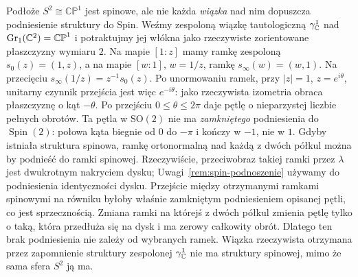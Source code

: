 \begin{przyklad}
\label{prz:nie-spin-linia}
Podłoże $S^2\cong\mathbb{CP}^1$ jest spinowe,
ale nie każda \emph{wiązka} nad nim dopuszcza
podniesienie struktury do Spin.
Weźmy zespoloną wiązkę tautologiczną
$\gamma^1_{\mathbb{C}}$ nad
$\operatorname{Gr}_1(\mathbb{C}^2)=\mathbb{CP}^1$
i potraktujmy jej włókna jako rzeczywiste
zorientowane płaszczyzny wymiaru $2$.
Na mapie $[1:z]$ mamy ramkę zespoloną
$s_0(z)=(1,z)$, a na mapie $[w:1]$,
$w=1/z$, ramkę $s_\infty(w)=(w,1)$.
Na przecięciu
$s_\infty(1/z)=z^{-1}s_0(z)$.
Po unormowaniu ramek, przy $|z|=1$, $z=e^{i\theta}$, unitarny
czynnik przejścia jest więc $e^{-i\theta}$:
jako rzeczywista izometria obraca płaszczyznę
o kąt $-\theta$. Po przejściu
$0\leq\theta\leq2\pi$ daje pętlę
o nieparzystej liczbie pełnych obrotów.
Ta pętla w $\mathrm{SO}(2)$ nie ma
\emph{zamkniętego} podniesienia do $\operatorname{Spin}(2)$:
połowa kąta biegnie
od $0$ do $-\pi$ i kończy w $-1$, nie w $1$.
Gdyby istniała struktura spinowa, ramkę ortonormalną nad każdą
z dwóch półkul można by podnieść do ramki spinowej.
Rzeczywiście, przeciwobraz takiej ramki przez $\lambda$ jest
dwukrotnym nakryciem dysku; Uwagi~\ref{rem:spin-podnoszenie}
używamy do podniesienia identyczności dysku. Przejście między
otrzymanymi ramkami spinowymi na równiku byłoby właśnie
zamkniętym podniesieniem opisanej pętli, co jest sprzecznością.
Zmiana ramki na którejś z dwóch półkul
zmienia pętlę tylko o taką, która przedłuża
się na dysk i ma zerowy całkowity obrót.
Dlatego ten brak podniesienia nie zależy
od wybranych ramek. Wiązka rzeczywista otrzymana przez zapomnienie
struktury zespolonej $\gamma^1_{\mathbb{C}}$ nie ma struktury
spinowej, mimo że sama sfera $S^2$ ją ma.
\end{przyklad}

